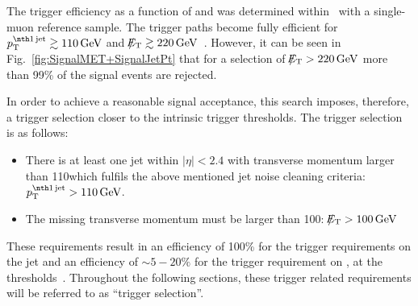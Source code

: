 The trigger efficiency as a function of \met and \ptfirstjet was determined within~\cite{bib:CMS:DM_8TeV} with a single-muon reference sample.
The trigger paths become fully efficient for $\ptfirstjet \gtrsim 110\gev$ and $\slash\mkern-12mu{E}_{\text{T}} \gtrsim 220\,\text{Ge}\kern-0.06667em\text{V}$~\cite{bib:CMS:DM_8TeV_AN}.
However, it can be seen in Fig.~\ref{fig:SignalMET+SignalJetPt} that for a selection of \mbox{$\slash\mkern-12mu{E}_{\text{T}}>220\,\text{Ge}\kern-0.06667em\text{V}$} more than 99\% of the signal events are rejected.

In order to achieve a reasonable signal acceptance, this search imposes, therefore, a trigger selection closer to the intrinsic trigger thresholds.
The trigger selection is as follows:
\begin{itemize}
\renewcommand{\labelitemi}{\footnotesize{\ding{118}}}
\item There is at least one jet within $|\eta|<2.4$ with transverse momentum larger than 110\gev which fulfils the above mentioned jet noise cleaning criteria: \mbox{$\ptfirstjet>110\gev$}.
\item The missing transverse momentum must be larger than 100\gev: \mbox{$\slash\mkern-12mu{E}_{\text{T}}>100\,\text{Ge}\kern-0.06667em\text{V}$}
\end{itemize}
These requirements result in an efficiency of 100\% for the trigger requirements on the jet \pt and an efficiency of $\sim5-20\%$ for the trigger requirement on \met, at the \met thresholds~\cite{bib:CMS:DM_8TeV_AN}.
Throughout the following sections, these trigger related requirements will be referred to as ``trigger selection''.\\  %

